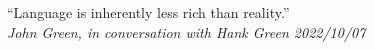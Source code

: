\documentclass[convert=imagemagick]{standalone}
\begin{document}
\parbox[t][36pt][c]{300pt}{
``Language is inherently less rich than reality.''\\
\textit{John Green, in conversation with Hank Green 2022/10/07}
}
\end{document}
